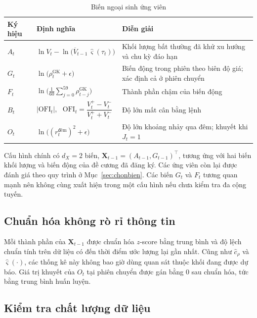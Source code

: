\documentclass[12pt,a4paper]{article}
\theoremstyle{definition}
\theoremstyle{remark}
\newcommand{\OFI}{\mathrm{OFI}}
\newcommand{\bX}{\mathbf{X}}
\begin{document}
\begin{table}[h]
\centering
\caption{Biến ngoại sinh ứng viên}\label{tab:ungvien}
\begin{tabular}{@{}llp{6.2cm}@{}}
\toprule
\textbf{Ký hiệu} & \textbf{Định nghĩa} & \textbf{Diễn giải} \\
\midrule
$A_t$ & $\ln V_t-\ln\!\big(\overline V_{t-1}\,\hat\varsigma(\tau_t)\big)$ & Khối lượng bất thường đã khử xu hướng và chu kỳ đáo hạn \\
$G_t$ & $\ln\big(\rho^{\mathrm{GK}}_t+\epsilon\big)$ & Biến động trong phiên theo biên độ giá; xác định cả ở phiên chuyển \\
$F_t$ & $\ln\!\big(\frac{1}{60}\sum_{j=0}^{59}\rho^{\mathrm{GK}}_{t-j}\big)$ & Thành phần chậm của biến động \\
$B_t$ & $\big|\OFI_t\big|$, \ $\OFI_t=\dfrac{V^{+}_t-V^{-}_t}{V^{+}_t+V^{-}_t}$ & Độ lớn mất cân bằng lệnh \\
$O_t$ & $\ln\big((r^{\text{đêm}}_t)^2+\epsilon\big)$ & Độ lớn khoảng nhảy qua đêm; khuyết khi $J_t=1$ \\
\bottomrule
\end{tabular}
\end{table}

Cấu hình chính có $d_X=2$ biến, $\bX_{t-1}=(A_{t-1},G_{t-1})^\top$, tương ứng với hai biến khối lượng và biến động của đề cương đã đăng ký. Các ứng viên còn lại được đánh giá theo quy trình ở Mục~\ref{sec:chonbien}. Các biến $G_t$ và $F_t$ tương quan mạnh nên không cùng xuất hiện trong một cấu hình nếu chưa kiểm tra đa cộng tuyến.

\subsection{Chuẩn hóa không rò rỉ thông tin}

Mỗi thành phần của $\bX_{t-1}$ được chuẩn hóa $z$-score bằng trung bình và độ lệch chuẩn tính trên dữ liệu có đến thời điểm ước lượng lại gần nhất. Cũng như $\hat c_\rho$ và $\hat\varsigma(\cdot)$, các thống kê này không bao giờ dùng quan sát thuộc khối đang được dự báo. Giá trị khuyết của $O_t$ tại phiên chuyển được gán bằng $0$ sau chuẩn hóa, tức bằng trung bình huấn luyện.

\subsection{Kiểm tra chất lượng dữ liệu}
\end{document}

